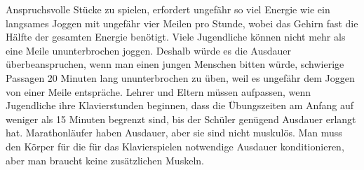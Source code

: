 Anspruchsvolle Stücke zu spielen, erfordert ungefähr so viel Energie wie ein langsames Joggen mit ungefähr vier Meilen pro Stunde, wobei das Gehirn fast die Hälfte der gesamten Energie benötigt.
Viele Jugendliche können nicht mehr als eine Meile ununterbrochen joggen.
Deshalb würde es die Ausdauer überbeanspruchen, wenn man einen jungen Menschen bitten würde, schwierige Passagen 20 Minuten lang ununterbrochen zu üben, weil es ungefähr dem Joggen von einer Meile entspräche.
Lehrer und Eltern müssen aufpassen, wenn Jugendliche ihre Klavierstunden beginnen, dass die Übungszeiten am Anfang auf weniger als 15 Minuten begrenzt sind, bis der Schüler genügend Ausdauer erlangt hat.
Marathonläufer haben Ausdauer, aber sie sind nicht muskulös.
Man muss den Körper für die für das Klavierspielen notwendige Ausdauer konditionieren, aber man braucht keine zusätzlichen Muskeln.

